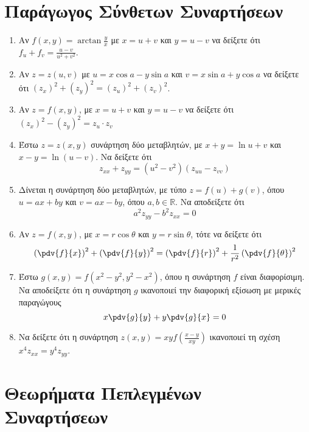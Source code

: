 \section{Παράγωγος Σύνθετων Συναρτήσεων} 

\begin{enumerate}
  \item Αν $ f(x,y) = \arctan{\frac{y}{x}} $ με $ x=u+v $ και $ y = u-v $ 
    να δείξετε ότι $ f_{u} + f_{v} = \frac{u-v}{u^{2}+v^{2}} $.

  \item  Αν $ z=z(u,v) $ με $ u=x \cos{a} - y \sin{a} $ και $ v= x \sin{a} + y \cos{a} $
    να δείξετε ότι $ (z_{x})^{2} + (z_{y})^{2} = (z_{u})^{2} + (z_{v})^{2} $.

  \item Αν $ z=f(x,y) $, με $ x=u+v $ και $ y = u-v $ να δείξετε ότι 
    $ (z_{x})^{2} - (z_{y})^{2} = z_{u}\cdot z_{v} $ 

  \item Έστω $ z=z(x,y) $ συνάρτηση δύο μεταβλητών, με $ x+y= \ln{u+v} $ και 
    $ x-y = \ln{(u-v)} $. Να δείξετε ότι 
    \[
      z_{xx}+z_{yy} = (u^{2}-v^{2})(z_{uu}-z_{vv}) 
    \]
  \item Δίνεται η συνάρτηση δύο μεταβλητών, με τύπο
    $ z = f(u) + g(v) $, όπου $ u = ax + by $ και $ v = ax - by $, όπου 
    $ a,b \in \mathbb{R} $. Να αποδείξετε ότι 
    \[
      a^{2} z_{yy} - b^{2}z_{xx} = 0 
    \] 
  \item Αν $ z = f(x,y) $, με $ x=r \cos{\theta} $ και $ y = r \sin{\theta} $, 
    τότε να δείξετε ότι
    \[
      \left(\pdv{f}{x}\right)^{2} + \left(\pdv{f}{y}\right)^{2} = 
      \left(\pdv{f}{r}\right)^{2} + \frac{1}{ r^{2}} 
      \left(\pdv{f}{\theta}\right)^{2} 
    \] 
  \item Έστω $ g(x,y) = f(x^{2} - y^{2}, y^{2} - x^{2}) $, όπου η συνάρτηση 
    $f$ είναι διαφορίσιμη. Να αποδείξετε ότι η συνάρτηση $g$ ικανοποιεί 
    την διαφορική εξίσωση με μερικές παραγώγους
    \[
      x\pdv{g}{y} + y\pdv{g}{x} = 0
    \] 
  \item Να δείξετε ότι η συνάρτηση $ z(x,y) = xyf\left(\frac{ x-y }{ xy }\right) $
    ικανοποιεί τη σχέση $ x^{4} z_{xx} = y^{4} z_{yy} $.


\end{enumerate}

\section{Θεωρήματα Πεπλεγμένων Συναρτήσεων}

